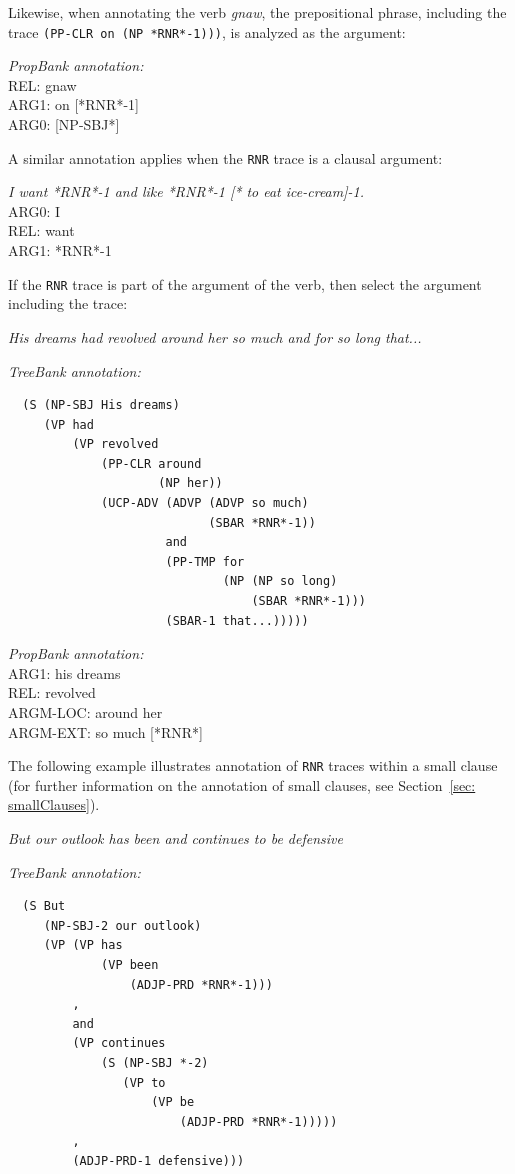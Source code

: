 \documentclass[11pt]{report}
\begin{document}
Likewise, when annotating the verb \textit{gnaw}, the prepositional phrase, including the trace \texttt{(PP-CLR on (NP *RNR*-1)))}, is analyzed as the argument:

\textit{PropBank annotation:}\\
REL:  gnaw\\
ARG1: on [*RNR*-1]\\ 
ARG0: [NP-SBJ*] 

A similar annotation applies when the \texttt{RNR} trace is a clausal argument:

\textit{I want *RNR*-1 and like *RNR*-1 [* to eat ice-cream]-1.}\\
ARG0:           I\\
REL:            want\\
ARG1:           *RNR*-1

If the \texttt{RNR} trace is part of the argument of the verb, then select the argument including the trace:

\textit{His dreams had revolved around her so much and for so long that...}

\textit{TreeBank annotation:}
 \begin{verbatim}
  (S (NP-SBJ His dreams)
     (VP had
         (VP revolved
             (PP-CLR around
                     (NP her))
             (UCP-ADV (ADVP (ADVP so much)
                            (SBAR *RNR*-1))
                      and
                      (PP-TMP for
                              (NP (NP so long)
                                  (SBAR *RNR*-1)))
                      (SBAR-1 that...)))))
\end{verbatim}
 
\textit{PropBank annotation:}\\
ARG1:	his dreams\\
REL: 	revolved\\
ARGM-LOC: around her\\
ARGM-EXT:  so much [*RNR*] 

The following example illustrates annotation of \texttt{RNR} traces within a small clause (for further information on the annotation of small clauses, see Section~\ref{sec: smallClauses}). 

\textit{But our outlook has been and continues to be defensive}
 
\textit{TreeBank annotation:}
 \begin{verbatim}
  (S But
     (NP-SBJ-2 our outlook)
     (VP (VP has
             (VP been
                 (ADJP-PRD *RNR*-1)))
         ,
         and
         (VP continues
             (S (NP-SBJ *-2)
                (VP to
                    (VP be
                        (ADJP-PRD *RNR*-1)))))
         ,
         (ADJP-PRD-1 defensive)))
\end{verbatim}
 
\end{document}
